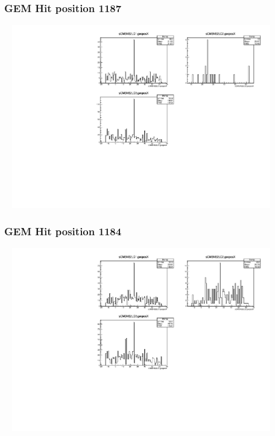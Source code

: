 \documentclass[slidestop,compress,mathserif]{beamer}
\begin{document}
\begin{frame}\frametitle{GEM Hit position 1187}
	 \includegraphics[width=12cm,height=8cm]{GEM_Hit_position_1187.pdf}
\end{frame}
\begin{frame}\frametitle{GEM Hit position 1184}
	 \includegraphics[width=12cm,height=8cm]{GEM_Hit_position_1184.pdf}
\end{frame}
\end{document}
